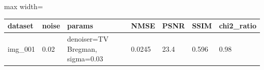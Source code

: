\begin{center}\begin{minipage}{\linewidth}\centering
{}
\begin{adjustbox}{max width=\linewidth}
\begin{tabular}{lllllll}
\toprule
dataset & noise & params & NMSE & PSNR & SSIM & chi2\_ratio \\
\midrule
img\_001 & 0.02 & denoiser=TV Bregman, sigma=0.03 & 0.0245 & 23.4 & 0.596 & 0.98 \\
\bottomrule
\end{tabular}\end{adjustbox}\end{minipage}\end{center}
